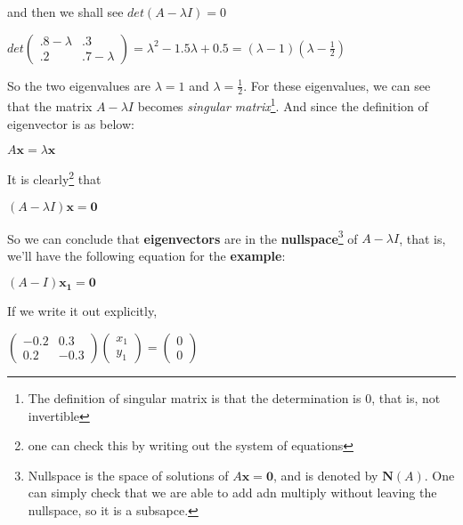 \documentclass[12pt]{article}
\begin{document}
and then we shall see $det(A-\lambda I) = 0$

\begin{center}
    $det\begin{pmatrix}
        .8-\lambda & .3\\
        .2 & .7-\lambda
        \end{pmatrix} = \lambda^{2}-1.5\lambda + 0.5 = (\lambda-1)(\lambda-\frac{1}{2})$
\end{center}

So the two eigenvalues are $\lambda = 1$ and $\lambda = \frac{1}{2}$.
For these eigenvalues, we can see that the matrix $A-\lambda I$ becomes \textit{singular matrix}\footnote{The definition of singular matrix is that the determination is 0, that is, not invertible}. And since the definition of eigenvector is as below:

\begin{center}
    $A \mathbf{x} = \lambda \mathbf{x}$
\end{center}

It is clearly\footnote{one can check this by writing out the system of equations} that

\begin{center}
    $(A-\lambda I)\mathbf{x} = \mathbf{0}$
\end{center}

So we can conclude that \textbf{eigenvectors} are in the \textbf{nullspace}\footnote{Nullspace is the space of solutions of $A\mathbf{x} = \mathbf{0}$, and is denoted by $\mathbf{N}(A)$. One can simply check that we are able to add adn multiply without leaving the nullspace, so it is a subsapce.} of $A- \lambda I$, that is, we'll have the following equation for the \textbf{example}:

\begin{center}
    $(A-I)\mathbf{x_{1} = \mathbf{0}}$
\end{center}

If we write it out explicitly,

\begin{center}
    $\begin{pmatrix}
        -0.2 & 0.3 \\
        0.2 & -0.3
    \end{pmatrix} \begin{pmatrix}
        x_1\\
        y_1
    \end{pmatrix}= \begin{pmatrix}
        0\\
        0
    \end{pmatrix}$
\end{center}
\end{document}
